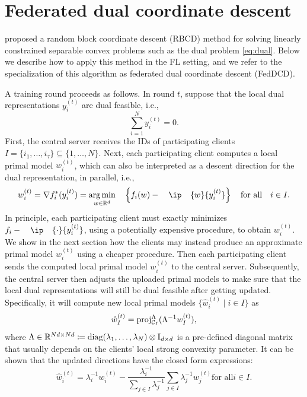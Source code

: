 \section{Federated dual coordinate descent}
\label{sec:FedDCD}

\citet{necoara2017random} proposed a random block coordinate descent (RBCD) method for solving linearly constrained separable convex problems such as the dual problem \eqref{eq:dual}. Below we describe how to apply this method in the FL setting, and we refer to the specialization of this algorithm as federated dual coordinate descent (FedDCD).

A training round proceeds as follows. In round $t$, suppose that the local dual representations $y_i^{(t)}$ are dual feasible, i.e., 
\[\sum_{i=1}^N y_i^{(t)} = 0.\]
First, the central server receives the IDs of participating clients $I = \{i_1, \dots, i_\tau\} \subseteq \{1,\dots,N\}$. Next, each participating client computes a local primal model $w_i^{(t)}$, which can also be interpreted as a descent direction for the dual representation, in parallel, i.e., 
\begin{equation} \label{eq:exact_gradient}
    w_i^{(t)} = \nabla f_i^*(y_i^{(t)}) =  \argmin{w \in \Real^d}\enspace \left\{ f_i(w) - \ip{w}{y_i^{(t)}} \right\}  \text{for all} i \in I.
\end{equation}
In principle, each participating client must exactly minimizes $f_i - \ip{\cdot}{y_i^{(t)}}$, using a potentially expensive procedure, to obtain $w_i^{(t)}$. We show in the next section how the clients may instead produce an approximate primal model $w_i^{(t)}$ using a cheaper procedure.
Then each participating client sends the computed local primal model $w_i^{(t)}$ to the central server. Subsequently, the central server then adjusts the uploaded primal models to make sure that the local dual representations will still be dual feasible after getting updated. Specifically, it will compute new local primal models $\{\hat w_i^{(t)} \mid i \in I\}$ as 
\begin{equation} \label{eq:direction_adjust2}
    \hat w_I^{(t)} = \operatorname{proj}_{\mathcal{C}_I}^{\Lambda}(\Lambda^{-1}w_I^{(t)}), 
\end{equation}
where $\Lambda\in\mathbb{R}^{Nd \times Nd} \coloneqq \operatorname{diag}( \lambda_1, \ldots, \lambda_N ) \otimes \mathbb{I}_{d\times d}$ is a pre-defined diagonal matrix that usually depends on the clients' local strong convexity parameter. It can be shown that the updated directions have the closed form expressions:
\begin{equation*} %
    \hat w_i^{(t)} = \lambda_i^{-1}  w_i^{(t)} - \frac{\lambda_i^{-1}}{\sum_{j \in I} \lambda_j^{-1}}\sum_{j \in I} \lambda_j^{-1} w_j^{(t)}  \text{for all} i \in I. 
\end{equation*}

